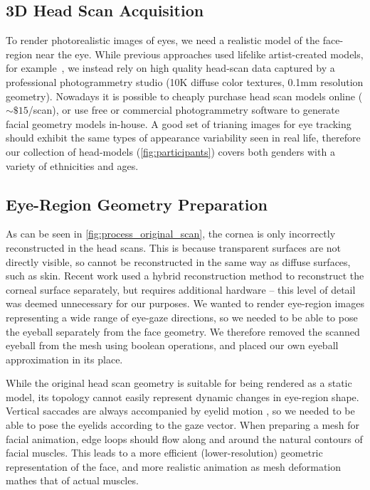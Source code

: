 \subsection{3D Head Scan Acquisition}
\label{sec:eye_region_geom_prep}



To render photorealistic images of eyes, we need a realistic model of the face-region near the eye.
While previous approaches used lifelike artist-created models, for example~\cite{swirski2014rendering}, we instead rely on high quality head-scan data captured by a professional photogrammetry studio (10K diffuse color textures, 0.1mm resolution geometry).
Nowadays it is possible to cheaply purchase head scan models online ($\sim\!\$15$/scan), or use free or commercial photogrammetry software to generate facial geometry models in-house.
A good set of trianing images for eye tracking should exhibit the same types of appearance variability seen in real life, therefore our collection of head-models (\autoref{fig:participants}) covers both genders with a variety of ethnicities and ages.

\subsection{Eye-Region Geometry Preparation}

As can be seen in \autoref{fig:process_original_scan}, the cornea is only incorrectly reconstructed in the head scans.
This is because transparent surfaces are not directly visible, so cannot be reconstructed in the same way as diffuse surfaces, such as skin.
Recent work used a hybrid reconstruction method to reconstruct the corneal surface separately, but requires additional hardware \cite{berard2014highquality} -- this level of detail was deemed unnecessary for our purposes.
We wanted to render eye-region images representing a wide range of eye-gaze directions, so we needed to be able to pose the eyeball separately from the face geometry.
We therefore removed the scanned eyeball from the mesh using boolean operations, and placed our own eyeball approximation
in its place.

While the original head scan geometry is suitable for being rendered as a static model, its topology cannot easily represent dynamic changes in eye-region shape.
Vertical saccades are always accompanied by eyelid motion \cite{liversedge2011oxford}, so we needed to be able to pose the eyelids according to the gaze vector.
When preparing a mesh for facial animation, edge loops should flow along and around the natural contours of facial muscles.
This leads to a more efficient (lower-resolution) geometric representation of the face, and more realistic animation as mesh deformation mathes that of actual muscles.

